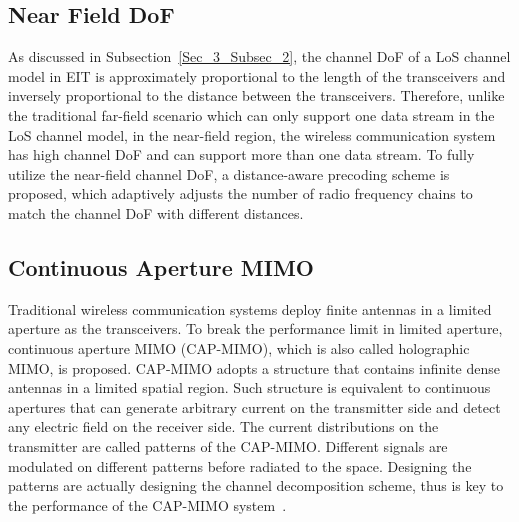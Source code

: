 \documentclass[journal,twocolumn]{IEEEtran}
\begin{document}
\subsection{Near Field DoF}
As discussed in Subsection~\ref{Sec_3_Subsec_2}, the channel DoF of a LoS channel model in EIT is approximately proportional to the length of the transceivers and inversely proportional to the distance between the transceivers. Therefore, unlike the traditional far-field scenario which can only support one data stream in the LoS channel model, in the near-field region, the wireless communication system has high channel DoF and can support more than one data stream. To fully utilize the near-field channel DoF, a distance-aware precoding scheme is proposed, which adaptively adjusts the number of radio frequency chains to match the channel DoF with different distances.   


\subsection{Continuous Aperture MIMO}
Traditional wireless communication systems deploy finite antennas in a limited aperture as the transceivers. To break the performance limit in limited aperture, continuous aperture MIMO (CAP-MIMO), which is also called holographic MIMO, is proposed. CAP-MIMO adopts a structure that contains infinite dense antennas in a limited spatial region. Such structure is equivalent to continuous apertures that can generate arbitrary current on the transmitter side and detect any electric field on the receiver side. The current distributions on the transmitter are called patterns of the CAP-MIMO. Different signals are modulated on different patterns before  radiated to the space. Designing the patterns are actually designing the channel decomposition scheme, thus is key to the performance of the CAP-MIMO system~\cite{zhang2022pdma}.
\end{document}
